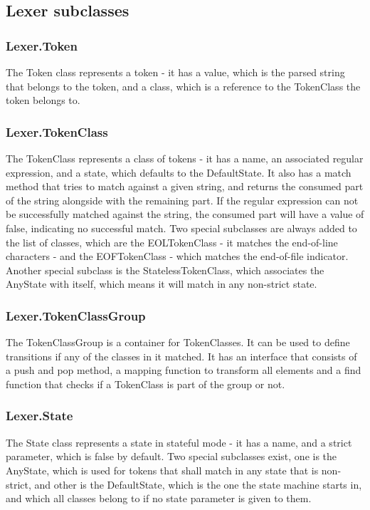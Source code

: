 \subsection{Lexer subclasses}
\subsubsection{Lexer.Token}
The Token class represents a token - it has a value, which is the parsed string that belongs to the token, and a class, which is a reference to the TokenClass the token belongs to.
\subsubsection{Lexer.TokenClass}
The TokenClass represents a class of tokens - it has a name, an associated regular expression, and a state, which defaults to the DefaultState. It also has a match method that tries to match against a given string, and returns the consumed part of the string alongside with the remaining part. If the regular expression can not be successfully matched against the string, the consumed part will have a value of false, indicating no successful match.
Two special subclasses are always added to the list of classes, which are the EOLTokenClass - it matches the end-of-line characters - and the EOFTokenClass - which matches the end-of-file indicator.
Another special subclass is the StatelessTokenClass, which associates the AnyState with itself, which means it will match in any non-strict state.
\subsubsection{Lexer.TokenClassGroup}
The TokenClassGroup is a container for TokenClasses. It can be used to define transitions if any of the classes in it matched. It has an interface that consists of a push and pop method, a mapping function to transform all elements and a find function that checks if a TokenClass is part of the group or not.
\subsubsection{Lexer.State}
The State class represents a state in stateful mode - it has a name, and a strict parameter, which is false by default.
Two special subclasses exist, one is the AnyState, which is used for tokens that shall match in any state that is non-strict, and other is the DefaultState, which is the one the state machine starts in, and which all classes belong to if no state parameter is given to them.
